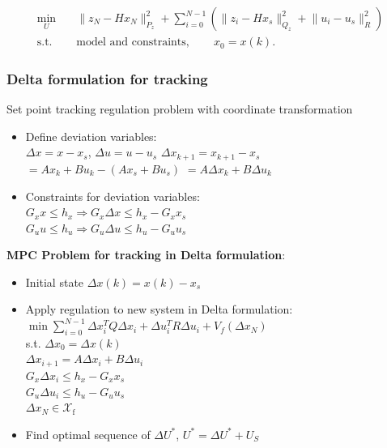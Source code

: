 \begin{tcolorbox}[eqbox]
\begin{align*}
\min_{U}\quad &
\lVert z_N-Hx_N\rVert_{P_z}^2
+\sum_{i=0}^{N-1}
\left(
\lVert z_i-Hx_s\rVert_{Q_z}^2
+\lVert u_i-u_s\rVert_R^2
\right) \\
\text{s.t.}\quad &
\text{model and constraints},\qquad x_0=x(k).
\end{align*}
\end{tcolorbox}


\subsubsection{Delta formulation for tracking}
Set point tracking \rightarrow regulation problem with coordinate transformation
\begin{itemize}
    \item Define deviation variables:\\
    $\Delta x=x-x_s$, $\Delta u=u-u_s$ \Rightarrow $\Delta x_{k+1}=x_{k+1}-x_s$\\
    $=Ax_k+Bu_k-(Ax_s+Bu_s)$
    $=A\Delta x_k+B\Delta u_k$
    \item Constraints for deviation variables:\\
    $G_xx\leq h_x\Rightarrow G_x\Delta x\leq h_x-G_xx_s$\\
    $G_uu\leq h_u \Rightarrow G_u\Delta u\leq h_u-G_uu_s$
\end{itemize}
\textbf{MPC Problem for tracking in Delta formulation}:\\
\noindent
\begin{minipage}[t]{0.62\linewidth}
\begin{itemize}
    \item Initial state $\Delta x(k)=x(k)-x_s$
    \item Apply regulation to new system in Delta formulation:\\
    \mbox{$\min \sum_{i=0}^{N-1}\Delta x_i^TQ\Delta x_i+\Delta u_i^TR\Delta u_i+V_f(\Delta x_N)$} \\
    s.t. $\Delta x_0=\Delta x(k)$
    \\$\Delta x_{i+1}=A\Delta x_i+B\Delta u_i$\\
    $G_x\Delta x_i\leq h_x-G_x x_s$\\
    $G_u\Delta u_i\leq h_u-G_uu_s$\\
    $\Delta x_N\in \mathcal{X}_\text{f}$
    \item Find optimal sequence of $\Delta U^*$, $U^* = \Delta U^* + U_S$
\end{itemize}
\end{minipage}%
